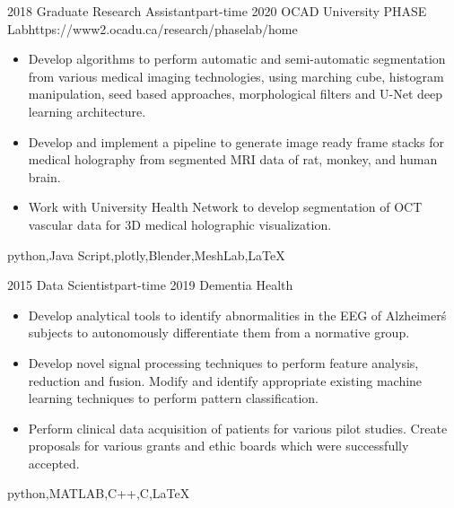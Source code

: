 \begin{experiences}
	\myExperience
	{2018}       {Graduate Research Assistant}{part-time}
	{2020}      {OCAD University PHASE Lab}{https://www2.ocadu.ca/research/phaselab/home}
	{
		\begin{itemize}
			\item Develop algorithms to perform automatic and semi-automatic segmentation from various medical imaging technologies, using marching cube, histogram manipulation, seed based approaches, morphological filters and U-Net deep learning architecture.
			\item Develop and implement a pipeline to generate image ready frame stacks for medical holography from segmented MRI data of rat, monkey, and human brain.
			\item Work with University Health Network to develop segmentation of OCT vascular data for 3D medical holographic visualization.
		\end{itemize}
	}
	{python,Java Script,plotly,Blender,MeshLab,\LaTeX}
	
	\emptySeparator	
	
	\myExperience
	{2015}       {Data Scientist}{part-time}
	{2019}      {Dementia Health}{}
	{
		\begin{itemize}
			\item Develop analytical tools to identify abnormalities in the EEG of Alzheimer\'s subjects to autonomously differentiate them from a normative group.
			\item  Develop novel signal processing techniques to perform feature analysis, reduction and fusion. Modify and identify appropriate existing machine learning techniques to perform pattern classification.
			\item Perform clinical data acquisition of patients for various pilot studies. Create proposals for various grants and ethic boards which were successfully accepted.
		\end{itemize}
	}
	{python,MATLAB,C++,C,\LaTeX}
	
	\emptySeparator
	

\end{experiences}
